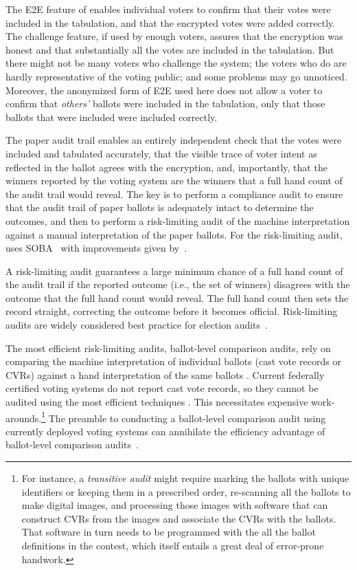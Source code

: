 \label{sec:audit}

The E2E feature of \projname enables individual voters to confirm that their votes were included in the
tabulation, and that the encrypted votes were added correctly.
The challenge feature, if used by enough voters, assures that the encryption was honest
and that substantially all the votes are included in the tabulation.
But there might not be many voters who challenge the system; the voters who do are hardly
representative of the voting public; and some problems may go unnoticed.
Moreover, the anonymized form of E2E used here does not allow a voter to confirm that \emph{others'} ballots were
included in the tabulation, only that those ballots that were included were included correctly.

The paper audit trail enables an entirely independent check 
that the votes were included and tabulated accurately, that
the visible trace of voter intent as reflected in the ballot agrees with the encryption, and, importantly, that
the winners reported by the voting system are the winners that a full hand count of the audit trail would
reveal.
The key is to perform a compliance audit to ensure that the audit trail of paper ballots
is adequately intact to determine the outcomes, and then to perform a risk-limiting
audit of the machine interpretation against a manual interpretation of the paper ballots.
For the risk-limiting audit, \projname uses SOBA~\cite{benalohEtal11} with improvements
given by~\cite{lindemanStark12}.

A risk-limiting audit guarantees a large minimum chance of a full hand count of the audit trail if the
reported outcome (i.e., the set of winners) 
disagrees with the outcome that the full hand count would reveal.
The full hand count then sets the record straight, correcting the outcome before it becomes official.
Risk-limiting audits are widely considered best practice for election audits~\cite{bestPractices08,whitePaper12}.

The most efficient risk-limiting audits, ballot-level comparison audits, rely on comparing 
the machine interpretation of individual ballots
(cast vote records or CVRs) 
against a hand interpretation of the same ballots \cite{stark10d,benalohEtal11,lindemanStark12}.
Current federally certified voting systems do not report cast vote records, so they cannot
be audited using the most efficient techniques \cite{lindemanStark12,starkWagner12}.
This necessitates expensive work-arounds.\footnote{%
    For instance, a {\em transitive audit\/} might require marking the ballots with unique identifiers
    or keeping them in a prescribed order, re-scanning all the ballots to make digital images,
    and processing those images with software that can construct CVRs from the images and
   associate the CVRs with the ballots.
   That software in turn needs to be programmed with the all the ballot definitions in the contest,
    which itself entails a great deal of error-prone handwork.
}
The preamble to conducting a ballot-level comparison audit using currently deployed voting systems
can annihilate the efficiency advantage of ballot-level comparison
audits~\cite{starkWagner12}.

